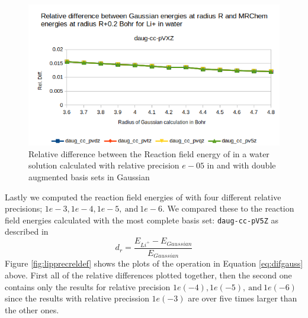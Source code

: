 \documentclass[../master_thesis.tex]{subfiles}
\begin{document}
\begin{figure}[h!]
  \centering
    \includegraphics[width=\linewidth]{img/lipdaugreldiff02.png}
  \caption{Relative difference between the Reaction field energy of  in a water solution calculated with relative precision $e-05$ in \mrchem
  and with double augmented basis sets in Gaussian}
  \label{fig:lipreldiff02daug}
\end{figure}

Lastly we computed the reaction field energies of  with four different
relative precisions; $1e-3, 1e-4, 1e-5,\  \text{and}\  1e-6$. We compared these
to the reaction field energies calculated with the most complete basis set:
\verb!daug-cc-pV5Z! as described in
\begin{equation}\label{eq:difgauss}
    d_r = \frac{E_{Li^+} - E_{Gaussian}}{E_{Gaussian}}
\end{equation}
Figure \ref{fig:lipprecreldef} shows the plots of the operation in Equation \ref{eq:difgauss} above.
First all of the relative differences plotted together, then the second one contains
only the results for relative precision $1e(-4), 1e(-5),\  \text{and}\  1e(-6)$ since
the results with relative precission $1e(-3)$ are over five times larger than the other ones.
\end{document}
